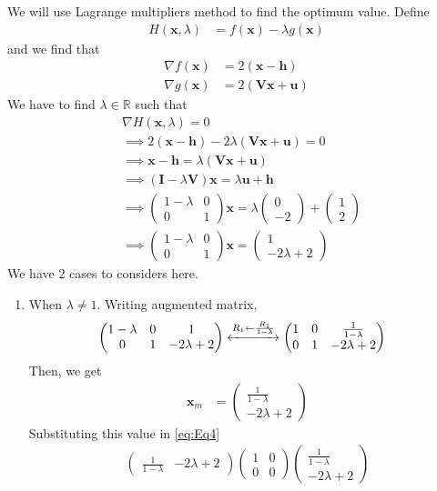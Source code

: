 \documentclass[12pt]{article}
\providecommand{\brak}[1]{\ensuremath{\left(#1\right)}}
\newcommand{\myvec}[1]{\ensuremath{\begin{pmatrix}#1\end{pmatrix}}}
\let\vec\mathbf
\begin{document}
\begin{enumerate}
We will use Lagrange multipliers method to find the optimum value. Define
\begin{align}
	H\brak{\vec{x}, \lambda} &= f\brak{\vec{x}} - \lambda g\brak{\vec{x}} 
\end{align}
and we find that 
\begin{align}
	\nabla f\brak{\vec{x}} &= 2\brak{\vec{x}-\vec{h}} \\
	\nabla g\brak{\vec{x}} &= 2\brak{\vec{V}\vec{x}+\vec{u}}
\end{align}
We have to find $\lambda \in \mathbb{R}$ such that
\begin{align}
	&\nabla H\brak{\vec{x},\lambda} = 0 \\
        \label{eq:Eqlambda}
	&\implies 2\brak{\vec{x}-\vec{h}} - 2\lambda\brak{\vec{V}\vec{x}+\vec{u}} = 0 \\
        \label{eq:Eqx}
	&\implies \vec{x} - \vec{h} =  \lambda\brak{\vec{V}\vec{x}+\vec{u}}   \\
	&\implies \brak{\vec{I} - \lambda\vec{V}}\vec{x} =  \lambda\vec{u}+\vec{h} \\ 
	&\implies \myvec{1-\lambda & 0 \\ 0 & 1}\vec{x} = \lambda\myvec{0 \\ -2} + \myvec{1 \\2} \\ 
        \label{eq:EqL}
	&\implies \myvec{1-\lambda & 0 \\ 0 & 1}\vec{x} = \myvec{1 \\ -2\lambda+2}  
\end{align}
We have 2 cases to considers here.
\begin{enumerate}
\item When $\lambda \ne 1$. Writing augmented matrix,
\begin{align}
	&\myvec{1-\lambda & 0 & 1\\ 0 & 1 & -2\lambda+2} \xleftrightarrow[]{R_1 \leftarrow \frac{R_1}{1-\lambda}} \myvec{1&0&\frac{1}{1-\lambda}\\0&1&-2\lambda+2}
\end{align}
Then, we get
\begin{align}
        \label{eq:Eqxm}
	\vec{x}_{m} &= \myvec{ \frac{1}{1-\lambda} \\ -2\lambda+2}
\end{align}
Substituting this value in \eqref{eq:Eq4}
\begin{multline}
	\myvec{\frac{1}{1-\lambda} & -2\lambda+2}\myvec{1 & 0 \\ 0 & 0}\myvec{\frac{1}{1-\lambda} \\ -2\lambda+2} \\ 

\end{multline}
\end{enumerate}
\end{enumerate}
\end{document}

